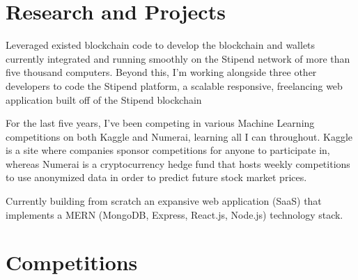 \documentclass[letterpaper]{resume_cv}
\begin{document}
\section{Research and Projects}

\begin{twenty}

	 {}{Leveraged existed blockchain code to develop the blockchain and wallets currently integrated and running smoothly on the Stipend network of more than five thousand computers. Beyond this, I'm working alongside three other developers to code the Stipend platform, a scalable responsive, freelancing web application built off of the Stipend blockchain}

	 {}{For the last five years, I've been competing in various Machine Learning competitions on both Kaggle and Numerai, learning all I can throughout. Kaggle is a site where companies sponsor competitions for anyone to participate in, whereas Numerai is a cryptocurrency hedge fund that hosts weekly competitions to use anonymized data in order to predict future stock market prices.}
	
     {}{Currently building from scratch an expansive web application (SaaS) that implements a MERN (MongoDB, Express, React.js, Node.js) technology stack.}


	
\end{twenty}

\section{Competitions}

\begin{twenty}


\end{twenty}
\end{document}
